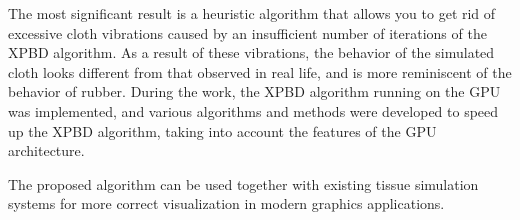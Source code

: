 The most significant result is a heuristic algorithm that allows you to get rid of excessive cloth vibrations caused by an insufficient number of iterations of the XPBD algorithm. As a result of these vibrations, the behavior of the simulated cloth looks different from that observed in real life, and is more reminiscent of the behavior of rubber. During the work, the XPBD algorithm running on the GPU was implemented, and various algorithms and methods were developed to speed up the XPBD algorithm, taking into account the features of the GPU architecture.

The proposed algorithm can be used together with existing tissue simulation systems for more correct visualization in modern graphics applications.	
	


\thispagestyle{empty}
%
